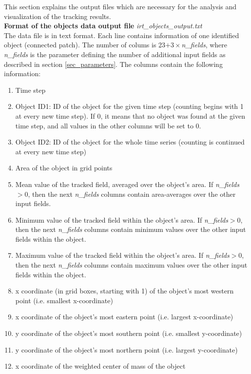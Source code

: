 \documentclass[11pt]{article}
\begin{document}
This section explains the output files which are necessary for the analysis and visualization of the tracking results.\vspace{0.5cm}\\
{\bf Format of the objects data output file} {\it irt\_objects\_output.txt}\\
The data file is in text format. Each line contains information of one identified object (connected patch). The number of colums is 23$+3\times${\it n\_fields}, where {\it n\_fields} is the parameter defining the number of additional input fields as described in section \ref{sec_parameters}. The columns contain the following information:
\begin{enumerate}
\item Time step
\item Object ID1: ID of the object for the given time step (counting begins with 1 at every new time step). If 0, it means that no object was found at the given time step, and all values in the other columns will be set to 0.
\item Object ID2: ID of the object for the whole time series (counting is continued at every new time step)
\item Area of the object in grid points
\item Mean value of the tracked field, averaged over the object's area. If {\it n\_fields}$>0$, then the next {\it n\_fields} columns contain area-averages over the other input fields.
\item Minimum value of the tracked field within the object's area. If {\it n\_fields}$>0$, then the next {\it n\_fields} columns contain minimum values over the other input fields within the object.
\item Maximum value of the tracked field within the object's area. If {\it n\_fields}$>0$, then the next {\it n\_fields} columns contain maximum values over the other input fields within the object.
\item x coordinate (in grid boxes, starting with 1) of the object's most western point (i.e. smallest x-coordinate)
\item x coordinate of the object's most eastern point (i.e. largest x-coordinate)
\item y coordinate of the object's most southern point (i.e. smallest y-coordinate)
\item y coordinate of the object's most northern point (i.e. largest y-coordinate)
\item x coordinate of the weighted center of mass of the object

\end{enumerate}
\end{document}
